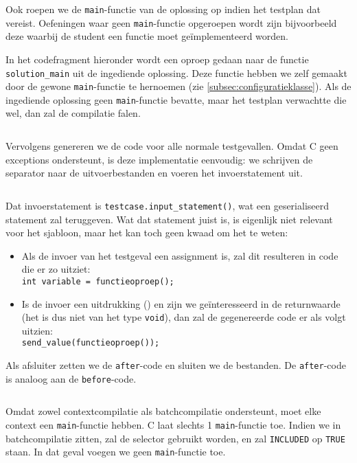 Ook roepen we de \texttt{main}-functie van de oplossing op indien het testplan dat vereist.
Oefeningen waar geen \texttt{main}-functie opgeroepen wordt zijn bijvoorbeeld deze waarbij de student een functie moet geïmplementeerd worden.

In het codefragment hieronder wordt een oproep gedaan naar de functie \texttt{solution\_main} uit de ingediende oplossing.
Deze functie hebben we zelf gemaakt door de gewone \texttt{main}-functie te hernoemen (zie \cref{subsec:configuratieklasse}).
Als de ingediende oplossing geen \texttt{main}-functie bevatte, maar het testplan verwachtte die wel, dan zal de compilatie falen.

\inputminted[firstline=38,lastline=49]{mako}{sources/c-context.mako}

Vervolgens genereren we de code voor alle normale testgevallen.
Omdat C geen exceptions ondersteunt, is deze implementatie eenvoudig: we schrijven de separator naar de uitvoerbestanden en voeren het invoerstatement uit.

\inputminted[firstline=52,lastline=56]{mako}{sources/c-context.mako}

Dat invoerstatement is \texttt{testcase.input\_statement()}, wat een geserialiseerd statement zal teruggeven.
Wat dat statement juist is, is eigenlijk niet relevant voor het sjabloon, maar het kan toch geen kwaad om het te weten:

\begin{itemize}
    \item Als de invoer van het testgeval een assignment is, zal dit resulteren in code die er zo uitziet: \\
    \texttt{int variable = functieoproep();}
    
    \item Is de invoer een uitdrukking () en zijn we geïnteresseerd in de returnwaarde (het is dus niet van het type \texttt{void}), dan zal de gegenereerde code er als volgt uitzien: \\
    \texttt{send_value(functieoproep());}
\end{itemize}

Als afsluiter zetten we de \texttt{after}-code en sluiten we de bestanden.
De \texttt{after}-code is analoog aan de \texttt{before}-code.

\inputminted[firstline=58,lastline=63]{mako}{sources/c-context.mako}

Omdat \tested{} zowel contextcompilatie als batchcompilatie ondersteunt, moet elke context een \texttt{main}-functie hebben.
C laat slechts 1 \texttt{main}-functie toe.
Indien we in batchcompilatie zitten, zal de selector gebruikt worden, en zal \texttt{INCLUDED} op \texttt{TRUE} staan.
In dat geval voegen we geen \texttt{main}-functie toe.

